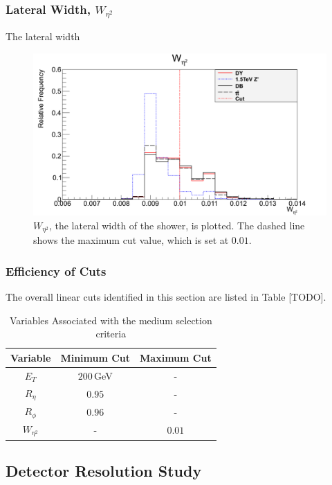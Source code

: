 \documentclass{article}
\begin{document}
\subsubsection{Lateral Width, $W_{\eta^2}$}

The lateral width

\begin{figure}[h]
    \centering
    \includegraphics[scale=0.25]{images/variables/wEta.png}
    \caption{$W_{\eta^2}$, the lateral width of the shower, is plotted. The dashed line shows the maximum cut value, which is set at $0.01$\label{fig:wEta}. }
\end{figure}


\subsubsection{Efficiency of Cuts}

The overall linear cuts identified in this section are listed in Table [TODO].

\begin{table}[h!t]
\centering
\caption{ Variables Associated with the medium selection criteria \cite{ElectronPerformanceMeasurements}\label{table:mediumVariables}}
\begin{tabular}{|c|c|c| } 
\hline
Variable & Minimum Cut & Maximum Cut\\\hline
$E_T$ & $200\,$GeV  & -\\\hline
$R_{\eta}$ & $0.95$ & -\\\hline
$R_{\phi}$ & $0.96$ & -\\\hline
$W_{\eta^2}$ & - & $0.01$ \\\hline
\end{tabular}
\end{table}


\subsection{Detector Resolution Study}
\end{document}
